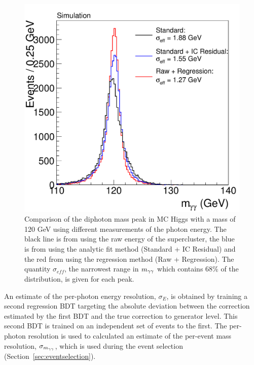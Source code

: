 \begin{figure}
\includegraphics[width=.6\textwidth]{hgg7TeV/generalPlots/regrresall.pdf}
\caption{Comparison of the diphoton mass peak in MC Higgs with a mass of 120 GeV using different 
measurements of the photon energy. The black line 
is from using the raw energy of the supercluster, the blue is from using the analytic fit method 
(Standard + IC Residual) 
and the red from using the regression method (Raw + Regression). The quantity $\sigma_{eff}$,
the narrowest range in $m_{\gamma\gamma}$ which contains 68\% of the distribution, is given for each peak.}
\label{fig:mcregrcomparison}
\end{figure}

An estimate of the per-photon energy resolution, $\sigma_{E}$, is obtained by training a second 
regression BDT targeting the absolute deviation between the correction estimated by the 
first BDT and the true correction to generator level. This second BDT is trained on an independent
set of events to the first. The per-photon resolution is used to calculated an estimate of the 
per-event mass resolution, $\sigma_{m_{\gamma\gamma}}$, which is used during the event selection 
(Section~\ref{sec:eventselection}). 

